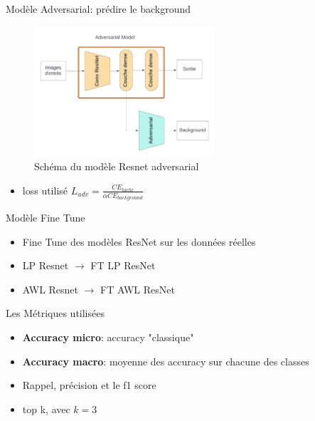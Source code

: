 \documentclass[11pt]{beamer}
\begin{document}
\begin{frame}{Modèle Adversarial: prédire le background}
    \begin{figure}
        \centering
        \includegraphics[width=0.6\textwidth]{../asset/Resnet_adv.png}
        \caption{Schéma du modèle Resnet adversarial}
        \label{fig:resnet_adv}
    \end{figure}
    \begin{itemize}
        \item loss utilisé $L_{adv} = \frac{CE_{tache}}{\alpha CE_{background}}$
    \end{itemize}
\end{frame}

\begin{frame}{Modèle Fine Tune}
    \begin{itemize}
        \item Fine Tune des modèles ResNet sur les données réelles
        \item LP Resnet $\rightarrow$ FT LP ResNet
        \item AWL Resnet $\rightarrow$ FT AWL ResNet
    \end{itemize}
\end{frame}

\begin{frame}{Les Métriques utilisées}
    \begin{itemize}
        \item \textbf{Accuracy micro}: accuracy "classique"
        \item \textbf{Accuracy macro}: moyenne des accuracy sur chacune des classes
        \item Rappel, précision et le f1 score
        \item top k, avec $k=3$
    \end{itemize}
\end{frame}
\end{document}
